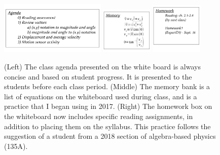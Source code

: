 \documentclass[../../../main.tex]{subfiles}
\begin{document}
\begin{figure}[ht]
\centering
\includegraphics[width=0.45\textwidth]{ExampleAgenda.pdf}
\includegraphics[width=0.22\textwidth]{ExampleMemory.pdf}
\includegraphics[width=0.22\textwidth]{ExampleHomework.pdf}
\caption{\label{fig:courses:intro:exampleAgenda} (Left) The class agenda presented on the white board is always concise and based on student progress.  It is presented to the students before each class period.  (Middle) The memory bank is a list of equations on the whiteboard used during class, and is a practice that I began using in 2017.  (Right) The homework box on the whiteboard now includes specific reading assignments, in addition to placing them on the syllabus.  This practice follows the suggestion of a student from a 2018 section of algebra-based physics (135A).}
\end{figure}
\end{document}
